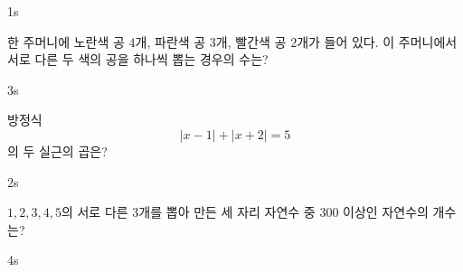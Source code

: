 \documentclass[10pt]{article}
\begin{document}


\setlength{\probboxheight}{65mm}

\begin{pagepair}
\noindent
\begin{minipage}[t][\probboxheight][t]{0.46\linewidth}
\begin{problem}{1}{s}
\par\smallskip
한 주머니에 노란색 공 $4$개, 파란색 공 $3$개, 빨간색 공 $2$개가 들어 있다. 이 주머니에서 서로 다른 두 색의 공을 하나씩 뽑는 경우의 수는? 
\begin{choices}
\end{choices}
\end{problem}
\end{minipage}\hfill
\begin{minipage}[t][\probboxheight][t]{0.46\linewidth}
\begin{problem}{3}{s}
\par\smallskip
방정식
\[ |x - 1| + |x + 2| = 5 \]
의 두 실근의 곱은?
\begin{choices}
\end{choices}
\end{problem}
\end{minipage}
\par\vspace{4mm}
\noindent
\begin{minipage}[t][\probboxheight][t]{0.46\linewidth}
\begin{problem}{2}{s}
\par\smallskip
$1, 2, 3, 4, 5$의 서로 다른 $3$개를 뽑아 만든 세 자리 자연수 중 $300$ 이상인 자연수의 개수는?
\begin{choices}
\end{choices}
\end{problem}
\end{minipage}\hfill
\begin{minipage}[t][\probboxheight][t]{0.46\linewidth}
\begin{problem}{4}{s}

\end{problem}
\end{minipage}
\end{pagepair}
\end{document}
